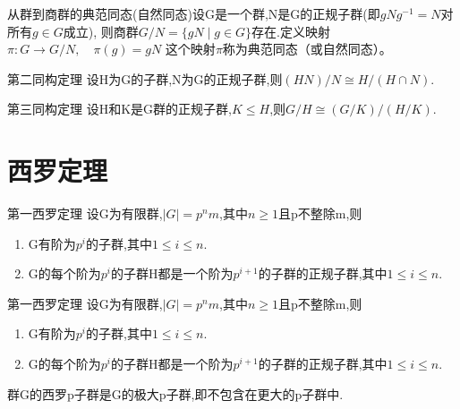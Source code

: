 \documentclass[oneside,openany]{ctexbook}
\begin{document}
从群到商群的典范同态(自然同态)设G是一个群,N是G的正规子群(即$gNg^{-1}=N$对所有$g\in G$成立),
则商群$G/N =\{gN\mid g\in G\}$存在.定义映射\:$\pi: G \to G/N, \quad \pi(g)=gN$
这个映射$\pi$称为典范同态（或自然同态）。

\begin{definition}{第二同构定理}{}
设H为G的子群,N为G的正规子群,则$(HN)/N\cong H/(H\cap N)$.
\end{definition}

\begin{definition}{第三同构定理}{}
设H和K是G群的正规子群,$K\leqslant H$,则$G/H\cong (G/K)/(H/K)$.
\end{definition}

\section{西罗定理}

\begin{definition}{第一西罗定理}{}
设G为有限群,$|G|=p^nm$,其中$n\geqslant 1$且p不整除m,则
\begin{enumerate}
  \item G有阶为$p^i$的子群,其中$1\leqslant i\leqslant n$.
  \item G的每个阶为$p^i$的子群H都是一个阶为$p^{i+1}$的子群的正规子群,其中$1\leqslant i\leqslant n$.
\end{enumerate}
\end{definition}

\begin{definition}{第一西罗定理}{}
设G为有限群,$|G|=p^nm$,其中$n\geqslant 1$且p不整除m,则
\begin{enumerate}
  \item G有阶为$p^i$的子群,其中$1\leqslant i\leqslant n$.
  \item G的每个阶为$p^i$的子群H都是一个阶为$p^{i+1}$的子群的正规子群,其中$1\leqslant i\leqslant n$.
\end{enumerate}
\end{definition}

\begin{definition}{}{}
群G的西罗p子群是G的极大p子群,即不包含在更大的p子群中.
\end{definition}
\end{document}
